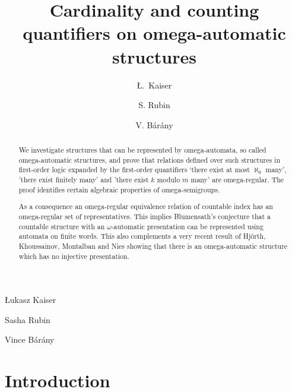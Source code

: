 \documentclass{stacs_proc}
\begin{document}
\title[Cardinality and counting quantifiers on omega-automatic structures]
{Cardinality and counting quantifiers on omega-automatic structures}

\author[mgi]{\L{}.~Kaiser}{\L{}ukasz Kaiser}
\author[uoa]{S. Rubin}{Sasha Rubin}
\author[mgi]{V. B\'ar\'any}{Vince  B\'ar\'any}

\address[mgi]{Mathematische Grundlagen der Informatik, RWTH Aachen}

\address[uoa]{Department of Computer Science, University of Auckland}







\begin{abstract}
We investigate structures that can be represented by omega-automata, so called
omega-automatic structures, and prove that relations defined over such
structures in first-order logic expanded by the first-order quantifiers `there
exist at most $\aleph_0$ many', 'there exist finitely many' and 'there exist
$k$ modulo $m$ many' are omega-regular. The proof identifies certain algebraic
properties of omega-semigroups.

As a consequence an omega-regular equivalence relation of countable index has
an omega-regular set of representatives. This implies Blumensath's conjecture
that a countable structure with an $\omega$-automatic presentation can be
represented using automata on finite words. This also complements a very recent
result of Hj\"orth, Khoussainov, Montalban and Nies showing that 
there is an omega-automatic structure which has no injective presentation. 


\end{abstract}










\maketitle






\vskip-0.3cm
\section{Introduction} \label{sec_intro}
\end{document}

